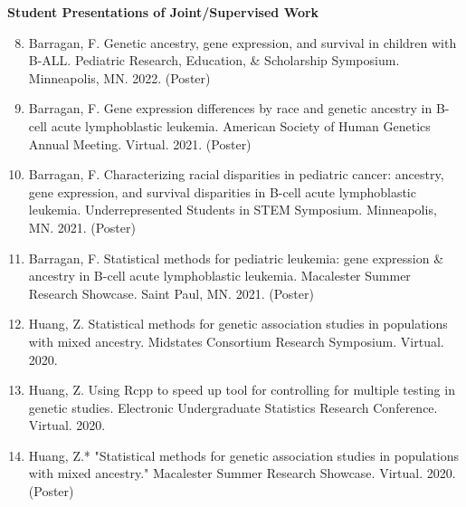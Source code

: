 \documentclass[margin]{res}
\newenvironment{benumerate}[1]{
    \let\oldItem\item
    \def\item{\addtocounter{enumi}{-2}\oldItem}
    
    \begin{enumerate}
    \setcounter{enumi}{#1}
    \addtocounter{enumi}{1}
}{
    \end{enumerate}
}
\begin{document}
\begin{resume}
\textbf{Student Presentations of Joint/Supervised Work}
\begin{benumerate}{7}
\item Barragan, F. Genetic ancestry, gene expression, and survival in children with B-ALL. Pediatric Research, Education, \& Scholarship Symposium. Minneapolis, MN. 2022. (Poster)
\item Barragan, F. Gene expression differences by race and genetic ancestry in B-cell acute lymphoblastic leukemia. American Society of Human Genetics Annual Meeting. Virtual. 2021. (Poster)
\item Barragan, F. Characterizing racial disparities in pediatric cancer: ancestry, gene expression, and survival disparities in B-cell acute lymphoblastic leukemia. Underrepresented Students in STEM Symposium. Minneapolis, MN. 2021. (Poster)
\item Barragan, F. Statistical methods for pediatric leukemia: gene expression \& ancestry in B-cell acute lymphoblastic leukemia. Macalester Summer Research Showcase. Saint Paul, MN. 2021. (Poster)
\item Huang, Z. Statistical methods for genetic association studies in populations with mixed ancestry. Midstates Consortium Research Symposium. Virtual. 2020.
\item Huang, Z. Using Rcpp to speed up tool for controlling for multiple testing in genetic studies. Electronic Undergraduate Statistics Research Conference. Virtual. 2020.
\item Huang, Z.* "Statistical methods for genetic association studies in populations with mixed ancestry." Macalester Summer Research Showcase. Virtual. 2020. (Poster) \\
\end{benumerate}





\end{resume}
\end{document}
